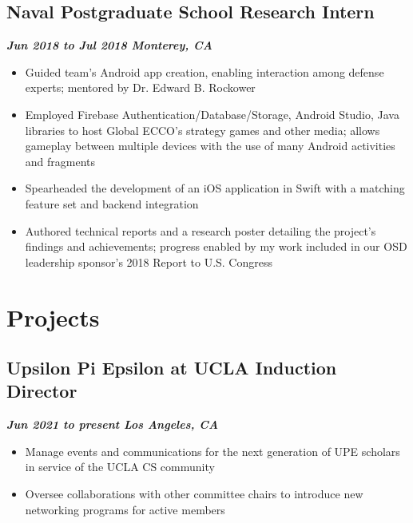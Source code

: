 \documentclass[10pt]{article}
\begin{document}
\begin{raggedright}
        \subsection*{\textbf{\large{Naval Postgraduate School \textendash{} Research Intern}}} \hfill \textbf{\textit{Jun 2018 to Jul 2018 \textendash{} Monterey, CA}}
        \begin{itemize}
            \item Guided team's Android app creation, enabling interaction among defense experts; mentored by Dr. Edward B. Rockower
            \item Employed Firebase Authentication/Database/Storage, Android Studio, Java libraries to host Global ECCO's strategy games and other media; allows gameplay between multiple devices with the use of many Android activities and fragments
            \item Spearheaded the development of an iOS application in Swift with a matching feature set and backend integration
            \item Authored technical reports and a research poster detailing the project's findings and achievements; progress enabled by my work included in our OSD leadership sponsor's 2018 Report to U.S. Congress
        \end{itemize}

    \section*{Projects}
        \subsection*{\textbf{\large{Upsilon Pi Epsilon at UCLA \textendash{} Induction Director}}} \hfill \textbf{\textit{Jun 2021 to present \textendash{} Los Angeles, CA}}
        \begin{itemize}
            \item Manage events and communications for the next generation of UPE scholars in service of the UCLA CS community
            \item Oversee collaborations with other committee chairs to introduce new networking programs for active members
        \end{itemize}


\end{raggedright}
\end{document}
